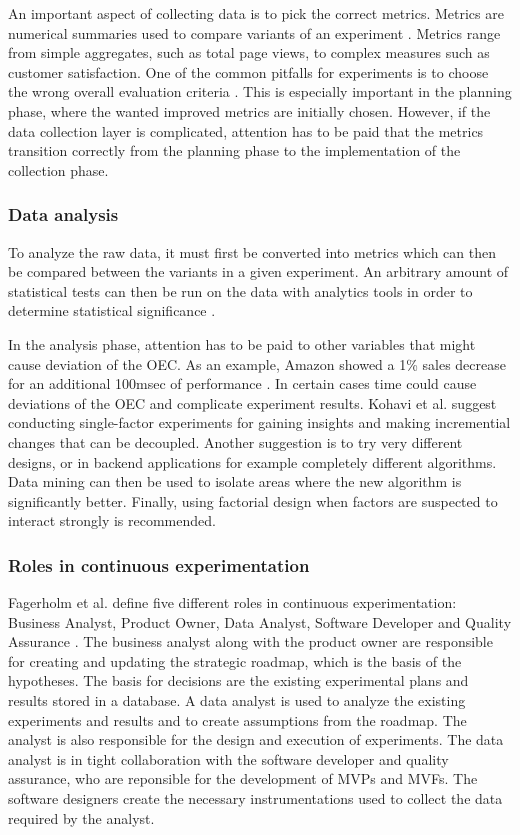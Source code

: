 \documentclass[english]{tktltiki2}
\theoremstyle{definition}
\theoremstyle{remark}
\begin{document}
An important aspect of collecting data is to pick the correct metrics. Metrics are numerical summaries used to compare variants of an experiment \cite{kohavi2009controlled}. Metrics range from simple aggregates, such as total page views, to complex measures such as customer satisfaction. One of the common pitfalls for experiments is to choose the wrong overall evaluation criteria \cite{crook2009seven}. This is especially important in the planning phase, where the wanted improved metrics are initially chosen. However, if the data collection layer is complicated, attention has to be paid that the metrics transition correctly from the planning phase to the implementation of the collection phase.  
\subsubsection{Data analysis}
To analyze the raw data, it must first be converted into metrics which can then be compared between the variants in a given experiment. An arbitrary amount of statistical tests can then be run on the data with analytics tools in order to determine statistical significance \cite{kohavi2009controlled}. 

In the analysis phase, attention has to be paid to other variables that might cause deviation of the OEC. As an example, Amazon showed a 1\% sales decrease for an additional 100msec of performance \cite{kohavi2007practical}. In certain cases time could cause deviations of the OEC and complicate experiment results. Kohavi et al. suggest conducting single-factor experiments for gaining insights and making incremential changes that can be decoupled. Another suggestion is to try very different designs, or in backend applications for example completely different algorithms. Data mining can then be used to isolate areas where the new algorithm is significantly better. Finally, using factorial design when factors are suspected to interact strongly is recommended. 


\subsubsection{Roles in continuous experimentation}
Fagerholm et al. define five different roles in continuous experimentation: Business Analyst, Product Owner, Data Analyst, Software Developer and Quality Assurance \cite{fagerholm2014building}. The business analyst along with the product owner are responsible for creating and updating the strategic roadmap, which is the basis of the hypotheses. The basis for decisions are the existing experimental plans and results stored in a database. A data analyst is used to analyze the existing experiments and results and to create assumptions from the roadmap. The analyst is also responsible for the design and execution of experiments. The data analyst is in tight collaboration with the software developer and quality assurance, who are reponsible for the development of MVPs and MVFs. The software designers create the necessary instrumentations used to collect the data required by the analyst.
\end{document}
